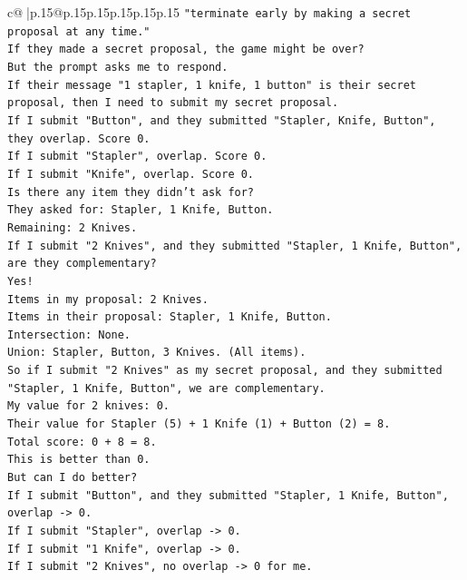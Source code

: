 \documentclass{article}
\begin{document}
{\begin{supertabular}{c@{$\;$}|p{.15\linewidth}@{}p{.15\linewidth}p{.15\linewidth}p{.15\linewidth}p{.15\linewidth}p{.15\linewidth}}
{{{\texttt{"terminate early by making a secret proposal at any time."} \\
\texttt{If they made a secret proposal, the game might be over?} \\
\texttt{But the prompt asks me to respond.} \\
\texttt{If their message "1 stapler, 1 knife, 1 button" is their secret proposal, then I need to submit my secret proposal.} \\
\texttt{If I submit "Button", and they submitted "Stapler, Knife, Button", they overlap. Score 0.} \\
\texttt{If I submit "Stapler", overlap. Score 0.} \\
\texttt{If I submit "Knife", overlap. Score 0.} \\
\texttt{Is there any item they didn't ask for?} \\
\texttt{They asked for: Stapler, 1 Knife, Button.} \\
\texttt{Remaining: 2 Knives.} \\
\texttt{If I submit "2 Knives", and they submitted "Stapler, 1 Knife, Button", are they complementary?} \\
\texttt{Yes!} \\
\texttt{Items in my proposal: 2 Knives.} \\
\texttt{Items in their proposal: Stapler, 1 Knife, Button.} \\
\texttt{Intersection: None.} \\
\texttt{Union: Stapler, Button, 3 Knives. (All items).} \\
\texttt{So if I submit "2 Knives" as my secret proposal, and they submitted "Stapler, 1 Knife, Button", we are complementary.} \\
\texttt{My value for 2 knives: 0.} \\
\texttt{Their value for Stapler (5) + 1 Knife (1) + Button (2) = 8.} \\
\texttt{Total score: 0 + 8 = 8.} \\
\texttt{This is better than 0.} \\
\texttt{But can I do better?} \\
\texttt{If I submit "Button", and they submitted "Stapler, 1 Knife, Button", overlap {-}> 0.} \\
\texttt{If I submit "Stapler", overlap {-}> 0.} \\
\texttt{If I submit "1 Knife", overlap {-}> 0.} \\
\texttt{If I submit "2 Knives", no overlap {-}> 0 for me.} \\
}}}
\end{supertabular}}
\end{document}

